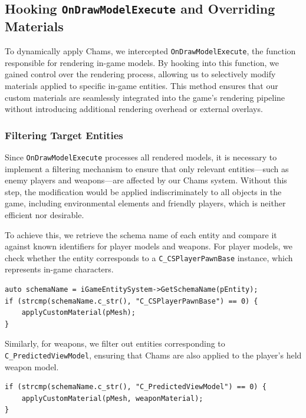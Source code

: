 \subsection{Hooking \texttt{OnDrawModelExecute} and Overriding Materials}

To dynamically apply Chams, we intercepted \texttt{OnDrawModelExecute}, the function responsible for rendering in-game models. By hooking into this function, we gained control over the rendering process, allowing us to selectively modify materials applied to specific in-game entities. This method ensures that our custom materials are seamlessly integrated into the game's rendering pipeline without introducing additional rendering overhead or external overlays.

\subsubsection{Filtering Target Entities}

Since \texttt{OnDrawModelExecute} processes all rendered models, it is necessary to implement a filtering mechanism to ensure that only relevant entities—such as enemy players and weapons—are affected by our Chams system. Without this step, the modification would be applied indiscriminately to all objects in the game, including environmental elements and friendly players, which is neither efficient nor desirable.

To achieve this, we retrieve the schema name of each entity and compare it against known identifiers for player models and weapons. For player models, we check whether the entity corresponds to a \texttt{C\_CSPlayerPawnBase} instance, which represents in-game characters.

\begin{lstlisting}[style=cppstyle, caption={Identifying Player Models}]
auto schemaName = iGameEntitySystem->GetSchemaName(pEntity);
if (strcmp(schemaName.c_str(), "C_CSPlayerPawnBase") == 0) {
    applyCustomMaterial(pMesh);
}
\end{lstlisting}

Similarly, for weapons, we filter out entities corresponding to \texttt{C\_PredictedViewModel}, ensuring that Chams are also applied to the player's held weapon model.

\begin{lstlisting}[style=cppstyle, caption={Applying Chams to Weapons}]
if (strcmp(schemaName.c_str(), "C_PredictedViewModel") == 0) {
    applyCustomMaterial(pMesh, weaponMaterial);
}
\end{lstlisting}

